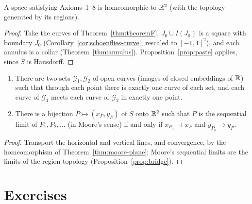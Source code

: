 
\begin{theorem}\label{thm:moore-plane}
A space satisfying Axioms~1--8 is homeomorphic to $\mathbb{R}^2$ (with the topology generated by its regions).
\end{theorem}

\begin{proof}
Take the curves of Theorem~\ref{thm:theoremF}. $J_0\cup I(J_0)$ is a square with boundary $J_0$ (Corollary~\ref{cor:schoenflies-curve},
rescaled to $[-1,1]^2$), and each annulus is a collar (Theorem~\ref{thm:annulus}). Proposition~\ref{prop:paste} applies, since $S$ is
Hausdorff.
\end{proof}


\begin{corollary}\label{cor:theoremG}
\leavevmode
\begin{enumerate}[label=(\alph*)]
\item There are two sets $\mathcal G_1,\mathcal G_2$ of open curves (images of closed embeddings of $\mathbb{R}$) such that through each point there is
exactly one curve of each set, and each curve of $\mathcal G_1$ meets each curve of $\mathcal G_2$ in exactly one point.
\item There is a bijection $P\mapsto(x_P,y_P)$ of $S$ onto $\mathbb{R}^2$ such that $P$ is the sequential limit of $P_1,P_2,\dots$ (in Moore's sense)
if and only if $x_{P_n}\to x_P$ and $y_{P_n}\to y_P$.
\end{enumerate}
\end{corollary}

\begin{proof}
Transport the horizontal and vertical lines, and convergence, by the homeomorphism of Theorem~\ref{thm:moore-plane}; Moore's sequential limits are
the limits of the region topology (Proposition~\ref{prop:bridge}).
\end{proof}


\section*{Exercises}


